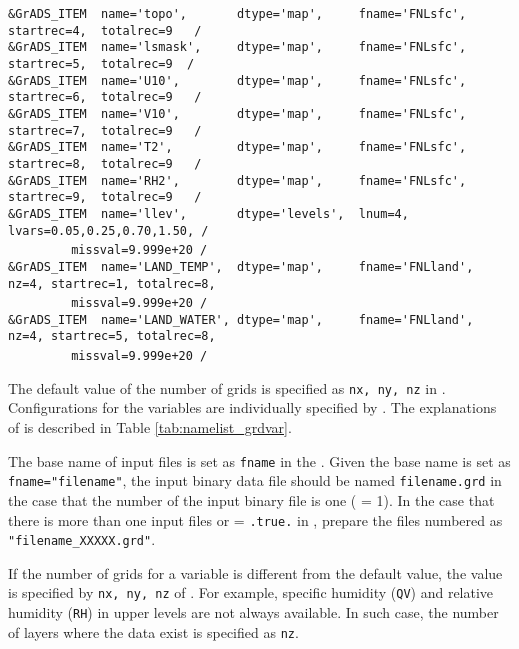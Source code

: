 {\verb|&GrADS_ITEM  name='topo',       dtype='map',     fname='FNLsfc', startrec=4,  totalrec=9   / |  \\
\verb|&GrADS_ITEM  name='lsmask',     dtype='map',     fname='FNLsfc', startrec=5,  totalrec=9  /  |  \\
\verb|&GrADS_ITEM  name='U10',        dtype='map',     fname='FNLsfc', startrec=6,  totalrec=9   / |  \\
\verb|&GrADS_ITEM  name='V10',        dtype='map',     fname='FNLsfc', startrec=7,  totalrec=9   / |  \\
\verb|&GrADS_ITEM  name='T2',         dtype='map',     fname='FNLsfc', startrec=8,  totalrec=9   / |  \\
\verb|&GrADS_ITEM  name='RH2',        dtype='map',     fname='FNLsfc', startrec=9,  totalrec=9   / |  \\
\verb|&GrADS_ITEM  name='llev',       dtype='levels',  lnum=4, lvars=0.05,0.25,0.70,1.50, /        |  \\
~~~~~~~~\verb| missval=9.999e+20 /|  \\
\verb|&GrADS_ITEM  name='LAND_TEMP',  dtype='map',     fname='FNLland', nz=4, startrec=1, totalrec=8,|\\
~~~~~~~~\verb| missval=9.999e+20 /|  \\
\verb|&GrADS_ITEM  name='LAND_WATER', dtype='map',     fname='FNLland', nz=4, startrec=5, totalrec=8,|\\
~~~~~~~~\verb| missval=9.999e+20 /|  \\
}

The default value of the number of grids is specified as \verb|nx, ny, nz| in .
Configurations for the variables are individually specified by .
The explanations of  is described in Table \ref{tab:namelist_grdvar}.

The base name of input files is set as \verb|fname| in the .
Given the base name is set as \verb|fname="filename"|, the input binary data file should be named  \verb|filename.grd| in the case that the number of the input binary file is one ( = 1).
In the case that there is more than one input files or  = \verb|.true.| in ,
prepare the files numbered as \verb|"filename_XXXXX.grd"|.

If the number of grids for a variable is different from the default value, the value is specified by \verb|nx, ny, nz| of .
For example, specific humidity (\verb|QV|) and relative humidity (\verb|RH|) in upper levels are not always available.
In such case, the number of layers where the data exist is specified as \verb|nz|.




